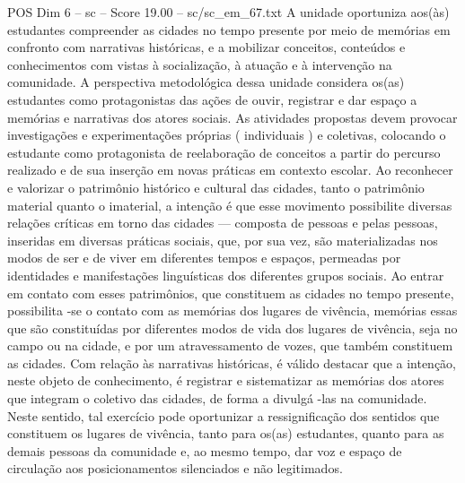 \begin{textsample}{POS Dim 6 – sc – Score 19.00 – sc/sc\_em\_67.txt}
A unidade oportuniza aos(às) estudantes compreender as cidades no tempo presente por meio de memórias em confronto com narrativas históricas, e a mobilizar conceitos, conteúdos e conhecimentos com vistas à socialização, à atuação e à intervenção na comunidade.
A perspectiva metodológica dessa unidade considera os(as) estudantes como protagonistas das ações de ouvir, registrar e dar espaço a memórias e narrativas dos atores sociais.
As atividades propostas devem provocar investigações e experimentações próprias ( individuais ) e coletivas, colocando o estudante como protagonista de reelaboração de conceitos a partir do percurso realizado e de sua inserção em novas práticas em contexto escolar.
Ao reconhecer e valorizar o patrimônio histórico e cultural das cidades, tanto o patrimônio material quanto o imaterial, a intenção é que esse movimento possibilite diversas relações críticas em torno das cidades — composta de pessoas e pelas pessoas, inseridas em diversas práticas sociais, que, por sua vez, são materializadas nos modos de ser e de viver em diferentes tempos e espaços, permeadas por identidades e manifestações linguísticas dos diferentes grupos sociais.
Ao entrar em contato com esses patrimônios, que constituem as cidades no tempo presente, possibilita -se o contato com as memórias dos lugares de vivência, memórias essas que são constituídas por diferentes modos de vida dos lugares de vivência, seja no campo ou na cidade, e por um atravessamento de vozes, que também constituem as cidades.
Com relação às narrativas históricas, é válido destacar que a intenção, neste objeto de conhecimento, é registrar e sistematizar as memórias dos atores que integram o coletivo das cidades, de forma a divulgá -las na comunidade.
Neste sentido, tal exercício pode oportunizar a ressignificação dos sentidos que constituem os lugares de vivência, tanto para os(as) estudantes, quanto para as demais pessoas da comunidade e, ao mesmo tempo, dar voz e espaço de circulação aos posicionamentos silenciados e não legitimados.

\end{textsample}
